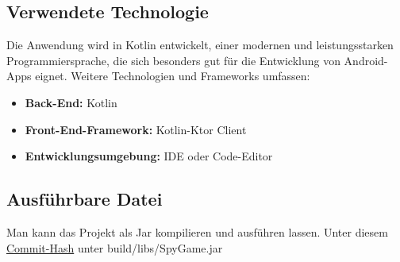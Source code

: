 \subsection{Verwendete Technologie}
Die Anwendung wird in Kotlin entwickelt, einer modernen und leistungsstarken Programmiersprache, die sich besonders gut für die Entwicklung von Android-Apps eignet. Weitere Technologien und Frameworks umfassen:
\begin{itemize}
    \item \textbf{Back-End:} Kotlin 
    \item \textbf{Front-End-Framework:} Kotlin-Ktor Client
    \item \textbf{Entwicklungsumgebung:}  IDE oder Code-Editor
\end{itemize}


\subsection{Ausführbare Datei}

Man kann das Projekt als Jar kompilieren und ausführen lassen. Unter diesem \href{https://github.com/lorenz1702/Spy-Game/commit/ea4fd2fed71a7a43e10448dd173c79ca53789201}{Commit-Hash} unter build/libs/SpyGame.jar
